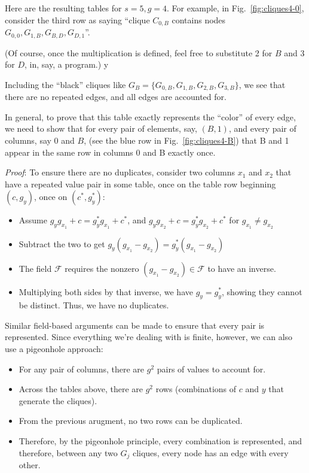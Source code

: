 \documentclass[11pt, oneside]{article} 	%
\begin{document}
Here are the resulting tables for $s=5, g=4$. For example, in Fig.~\ref{fig:cliques4-0}, consider the third row as saying ``clique $C_{0,B}$ contains nodes $G_{0,0}, G_{1,B}, G_{B,D}, G_{D,1}$''.


(Of course, once the multiplication is defined, feel free to substitute 2 for $B$ and 3 for $D$, in, say, a program.)
 y

Including the ``black'' cliques like $G_B = \{G_{0,B}, G_{1,B}, G_{2,B}, G_{3,B}\}$, we see that there are no repeated edges, and all edges are accounted for. 

In general, to prove that this table exactly represents the ``color'' of every edge, we need to show that for every pair of elements, say, $(B, 1)$, and every pair of columns, say $0$ and $B$, (see the blue row in Fig.~\ref{fig:cliques4-B}) that B and 1 appear in the same row in columns 0 and B exactly once. 

\emph{Proof}:
To ensure there are no duplicates, consider two columns $x_1$ and $x_2$ that have a repeated value pair in some table, once on the table row beginning $(c, g_y)$, once on $(c^*, g_y^*)$:

\begin{itemize}
\item Assume $g_yg_{x_1} + c = g_y^*g_{x_1} +c^*$, and $g_yg_{x_2} + c = g_y^*g_{x_2} +c^*$ for $g_{x_1} \neq g_{x_2}$
\item Subtract the two to get $g_y(g_{x_1} - g_{x_2}) = g_y^*(g_{x_1} - g_{x_2})$
\item The field $\mathcal{F}$ requires the nonzero $(g_{x_1} - g_{x_2}) \in \mathcal{F}$ to have an inverse. 
\item Multiplying both sides by that inverse, we have $g_y = g_y^*$, showing they cannot be distinct. Thus, we have no duplicates.
\end{itemize}

Similar field-based arguments can be made to ensure that every pair is represented. Since everything we're dealing with is finite, however, we can also use a pigeonhole approach:
\begin{itemize}
\item For any pair of columns, there are $g^2$ pairs of values to account for.
\item Across the tables above, there are $g^2$ rows (combinations of $c$ and $y$ that generate the cliques).
\item From the previous arugment, no two rows can be duplicated.
\item Therefore, by the pigeonhole principle, every combination is represented, and therefore, between any two $G_j$ cliques, every node has an edge with every other.
\end{itemize}
\end{document}

